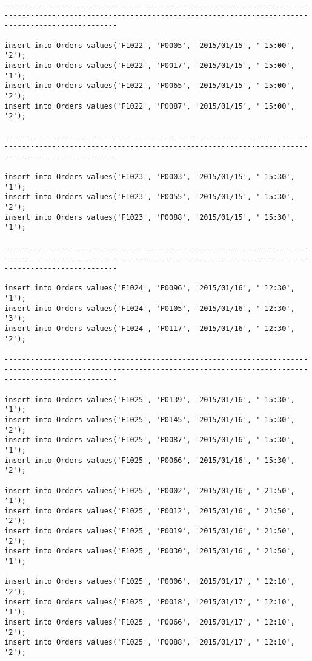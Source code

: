 \documentclass[a4,12pt]{report}
\begin{document}
\begin{lstlisting}
----------------------------------------------------------------------------------------------------------------------------------------------------------------------

insert into Orders values('F1022', 'P0005', '2015/01/15', ' 15:00', '2');
insert into Orders values('F1022', 'P0017', '2015/01/15', ' 15:00', '1');
insert into Orders values('F1022', 'P0065', '2015/01/15', ' 15:00', '2');
insert into Orders values('F1022', 'P0087', '2015/01/15', ' 15:00', '2');

----------------------------------------------------------------------------------------------------------------------------------------------------------------------

insert into Orders values('F1023', 'P0003', '2015/01/15', ' 15:30', '1');
insert into Orders values('F1023', 'P0055', '2015/01/15', ' 15:30', '2');
insert into Orders values('F1023', 'P0088', '2015/01/15', ' 15:30', '1');

----------------------------------------------------------------------------------------------------------------------------------------------------------------------

insert into Orders values('F1024', 'P0096', '2015/01/16', ' 12:30', '1');
insert into Orders values('F1024', 'P0105', '2015/01/16', ' 12:30', '3');
insert into Orders values('F1024', 'P0117', '2015/01/16', ' 12:30', '2');

----------------------------------------------------------------------------------------------------------------------------------------------------------------------

insert into Orders values('F1025', 'P0139', '2015/01/16', ' 15:30', '1');
insert into Orders values('F1025', 'P0145', '2015/01/16', ' 15:30', '2');
insert into Orders values('F1025', 'P0087', '2015/01/16', ' 15:30', '1');
insert into Orders values('F1025', 'P0066', '2015/01/16', ' 15:30', '2');

insert into Orders values('F1025', 'P0002', '2015/01/16', ' 21:50', '1');
insert into Orders values('F1025', 'P0012', '2015/01/16', ' 21:50', '2');
insert into Orders values('F1025', 'P0019', '2015/01/16', ' 21:50', '2');
insert into Orders values('F1025', 'P0030', '2015/01/16', ' 21:50', '1');

insert into Orders values('F1025', 'P0006', '2015/01/17', ' 12:10', '2');
insert into Orders values('F1025', 'P0018', '2015/01/17', ' 12:10', '1');
insert into Orders values('F1025', 'P0066', '2015/01/17', ' 12:10', '2');
insert into Orders values('F1025', 'P0088', '2015/01/17', ' 12:10', '2');


\end{lstlisting}
\end{document}
